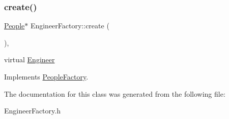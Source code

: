 \subsubsection{\texorpdfstring{create()}{create()}}
{\footnotesize\ttfamily \hyperlink{classPeople}{People}$\ast$ Engineer\+Factory\+::create (\begin{DoxyParamCaption}{ }\end{DoxyParamCaption})\hspace{0.3cm}{\ttfamily [inline]}, {\ttfamily [virtual]}}

virtual \hyperlink{classEngineer}{Engineer} 

Implements \hyperlink{classPeopleFactory}{People\+Factory}.



The documentation for this class was generated from the following file\+:\begin{DoxyCompactItemize}
\item 
Engineer\+Factory.\+h\end{DoxyCompactItemize}
